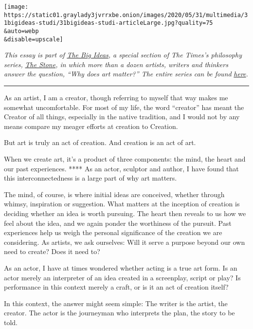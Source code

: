 \texttt{[image: https://static01.graylady3jvrrxbe.onion/images/2020/05/31/multimedia/31bigideas-studi/31bigideas-studi-articleLarge.jpg?quality=75\\\&auto=webp\\\&disable=upscale]}

\emph{This essay is part of}
\href{https://www.nytimes3xbfgragh.onion/spotlight/the-big-ideas}{\emph{The
Big Ideas}}\emph{, a special section of The Times's philosophy series,}
\href{https://www.nytimes3xbfgragh.onion/column/the-stone?action=click\&module=RelatedLinks\&pgtype=Article}{\emph{The
Stone}}\emph{, in which more than a dozen artists, writers and thinkers
answer the question, ``Why does art matter?'' The entire series can be
found}
\href{https://www.nytimes3xbfgragh.onion/spotlight/the-big-ideas}{\emph{here}}\emph{.}

\begin{center}\rule{0.5\linewidth}{\linethickness}\end{center}

As an artist, I am a creator, though referring to myself that way makes
me somewhat uncomfortable. For most of my life, the word ``creator'' has
meant the Creator of all things, especially in the native tradition, and
I would not by any means compare my meager efforts at creation to
Creation.

But art is truly an act of creation. And creation is an act of art.

When we create art, it's a product of three components: the mind, the
heart and our past experiences. **** As an actor, sculptor and author, I
have found that this interconnectedness is a large part of why art
matters.

The mind, of course, is where initial ideas are conceived, whether
through whimsy, inspiration or suggestion. What matters at the inception
of creation is deciding whether an idea is worth pursuing. The heart
then reveals to us how we feel about the idea, and we again ponder the
worthiness of the pursuit. Past experiences help us weigh the personal
significance of the creation we are considering. As artists, we ask
ourselves: Will it serve a purpose beyond our own need to create? Does
it need to?

As an actor, I have at times wondered whether acting is a true art form.
Is an actor merely an interpreter of an idea created in a screenplay,
script or play? Is performance in this context merely a craft, or is it
an act of creation itself?

In this context, the answer might seem simple: The writer is the artist,
the creator. The actor is the journeyman who interprets the plan, the
story to be told.


